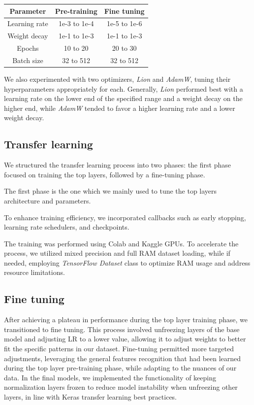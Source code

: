 \documentclass[11pt]{article}
\begin{document}
\begin{table}[h!]
    \centering
    \begin{tabular}{|c|c|c|}
        \hline
        \textbf{Parameter} & \textbf{Pre-training} & \textbf{Fine tuning} \\ \hline
        Learning rate & 1e-3 to 1e-4 & 1e-5 to 1e-6 \\ \hline
        Weight decay & 1e-1 to 1e-3 & 1e-1 to 1e-3 \\ \hline
        Epochs & 10 to 20 & 20 to 30 \\ \hline
        Batch size & 32 to 512 & 32 to 512 \\ \hline
    \end{tabular}
\end{table}

We also experimented with two optimizers, \textit{Lion} and \textit{AdamW}, tuning their hyperparameters appropriately for each. Generally, \textit{Lion} performed best with a learning rate on the lower end of the specified range and a weight decay on the higher end, while \textit{AdamW} tended to favor a higher learning rate and a lower weight decay.

\subsection{Transfer learning}

We structured the transfer learning process into two phases: the first phase focused on training the top layers, followed by a fine-tuning phase.

The first phase is the one which we mainly used to tune the top layers architecture and parameters.

To enhance training efficiency, we incorporated callbacks such as early stopping, learning rate schedulers, and checkpoints.

The training was performed using Colab and Kaggle GPUs. To accelerate the process, we utilized mixed precision and full RAM dataset loading, while if needed, employing \textit{TensorFlow Dataset} class to optimize RAM usage and address resource limitations.

\subsection{Fine tuning}

After achieving a plateau in performance during the top layer training phase, we transitioned to fine tuning. 
This process involved unfreezing layers of the base model and adjusting LR to a lower value, allowing it to adjust weights to better fit the specific patterns in our dataset. 
Fine-tuning permitted more targeted adjustments, leveraging the general features recognition that had been learned during the top layer pre-training phase, while adapting to the nuances of our data. In the final models, we implemented the functionality of keeping normalization layers frozen to reduce model instability when unfreezing other layers, in line with Keras transfer learning best practices.
\end{document}
